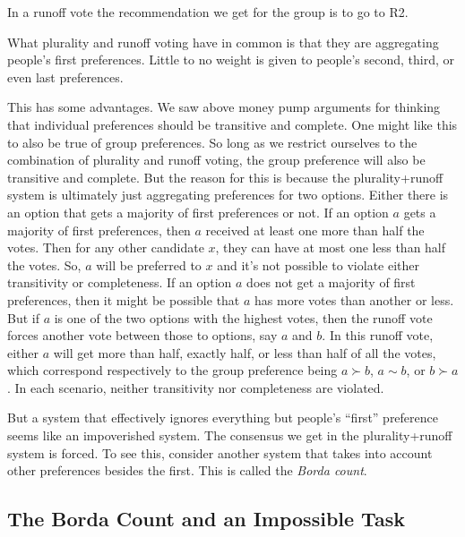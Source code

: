 \documentclass[]{tufte-book}
\begin{document}
In a runoff vote the recommendation we get for the group is to go to R2.

What plurality and runoff voting have in common is that they are aggregating people's first preferences. Little to no weight is given to people's second, third, or even last preferences.

This has some advantages. We saw above money pump arguments for thinking that individual preferences should be transitive and complete. One might like this to also be true of group preferences. So long as we restrict ourselves to the combination of plurality and runoff voting, the group preference will also be transitive and complete. But the reason for this is because the plurality+runoff system is ultimately just aggregating preferences for two options. Either there is an option that gets a majority of first preferences or not. If an option \(a\) gets a majority of first preferences, then \(a\) received at least one more than half the votes. Then for any other candidate \(x\), they can have at most one less than half the votes. So, \(a\) will be preferred to \(x\) and it's not possible to violate either transitivity or completeness. If an option \(a\) does not get a majority of first preferences, then it might be possible that \(a\) has more votes than another or less. But if \(a\) is one of the two options with the highest votes, then the runoff vote forces another vote between those to options, say \(a\) and \(b\). In this runoff vote, either \(a\) will get more than half, exactly half, or less than half of all the votes, which correspond respectively to the group preference being \(a\succ b\), \(a\sim b\), or \(b\succ a\). In each scenario, neither transitivity nor completeness are violated.

But a system that effectively ignores everything but people's ``first'' preference seems like an impoverished system. The consensus we get in the plurality+runoff system is forced. To see this, consider another system that takes into account other preferences besides the first. This is called the \emph{Borda count}.

\hypertarget{the-borda-count-and-an-impossible-task}{%
\subsection{The Borda Count and an Impossible Task}\label{the-borda-count-and-an-impossible-task}}
\end{document}
